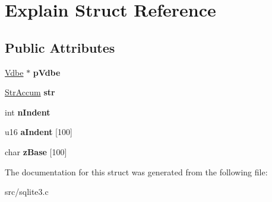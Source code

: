\hypertarget{struct_explain}{\section{Explain Struct Reference}
\label{struct_explain}
}
\subsection*{Public Attributes}
\begin{DoxyCompactItemize}
\item 
\hypertarget{struct_explain_a5b40aff5e9132f568c01f5790c69cc89}{\hyperlink{struct_vdbe}{Vdbe} $\ast$ {\bfseries p\-Vdbe}}\label{struct_explain_a5b40aff5e9132f568c01f5790c69cc89}

\item 
\hypertarget{struct_explain_af92c731731b19685b567d29493f1e83e}{\hyperlink{struct_str_accum}{Str\-Accum} {\bfseries str}}\label{struct_explain_af92c731731b19685b567d29493f1e83e}

\item 
\hypertarget{struct_explain_a5420e5a4c88050c6536328612fcad2b7}{int {\bfseries n\-Indent}}\label{struct_explain_a5420e5a4c88050c6536328612fcad2b7}

\item 
\hypertarget{struct_explain_ac80869acc619d982c3246134678b4d6e}{u16 {\bfseries a\-Indent} \mbox{[}100\mbox{]}}\label{struct_explain_ac80869acc619d982c3246134678b4d6e}

\item 
\hypertarget{struct_explain_a1ac782f9829311d6b85edc1707ef8d41}{char {\bfseries z\-Base} \mbox{[}100\mbox{]}}\label{struct_explain_a1ac782f9829311d6b85edc1707ef8d41}

\end{DoxyCompactItemize}


The documentation for this struct was generated from the following file\-:\begin{DoxyCompactItemize}
\item 
src/sqlite3.\-c\end{DoxyCompactItemize}
